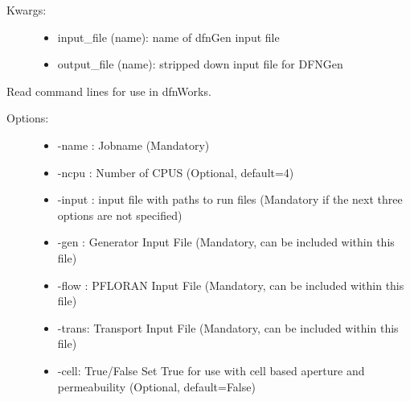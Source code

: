 \documentclass[letterpaper,10pt,english]{sphinxmanual}
\begin{document}
\begin{fulllineitems}
\begin{fulllineitems}
\begin{description}
\begin{itemize}
\end{itemize}

\item[{Kwargs:}] \leavevmode\begin{itemize}
\item {} 
input\_file (name): name of dfnGen input file

\item {} 
output\_file (name): stripped down input file for DFNGen

\end{itemize}

\end{description}

\end{fulllineitems}


\begin{fulllineitems}
\label{pydfnworks:pydfnworks.DFNWORKS.commandline_options}
Read command lines for use in dfnWorks.
\begin{description}
\item[{Options:}] \leavevmode\begin{itemize}
\item {} 
-name : Jobname (Mandatory)

\item {} 
-ncpu : Number of CPUS (Optional, default=4)

\item {} 
-input : input file with paths to run files (Mandatory if the next three options are not specified)

\item {} 
-gen : Generator Input File (Mandatory, can be included within this file)

\item {} 
-flow : PFLORAN Input File (Mandatory, can be included within this file)

\item {} 
-trans: Transport Input File (Mandatory, can be included within this file)

\item {} 
-cell: True/False Set True for use with cell based aperture and permeabuility (Optional, default=False)

\end{itemize}

\end{description}


\end{fulllineitems}
\end{fulllineitems}
\end{document}
